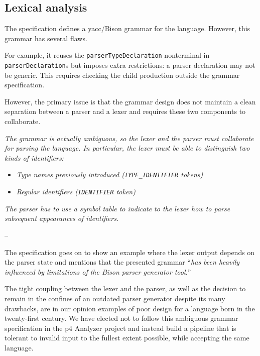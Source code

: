 \subsection{Lexical analysis}

The \pfs specification defines a \acrshort{yacc}/Bison grammar for the language.
However, this grammar has several flaws.

For example, it reuses the \texttt{parserTypeDeclaration} non\-terminal in
\texttt{parserDeclaration}s but imposes extra restrictions: a parser declaration
may not be generic. This requires checking the child production outside the
grammar specification.

However, the primary issue is that the grammar design does not maintain a clean
separation between a parser and a lexer and requires these two components to
collaborate.

\begin{displayquote}
	\textit{The grammar is actually ambiguous, so the lexer and the parser must
	collaborate for parsing the language. In particular, the lexer must be able
	to distinguish two kinds of identifiers:}

	\begin{itemize}
		\item \textit{Type names previously introduced (\texttt{TYPE\_IDENTIFIER}
		tokens)}
		\item \textit{Regular identifiers (\texttt{IDENTIFIER} token)}
	\end{itemize}

	\textit{The parser has to use a symbol table to indicate to the lexer how to
	parse subsequent appearances of identifiers.}

	--  \cite{p416:v123:spec}
\end{displayquote}

The specification goes on to show an example where the lexer output depends on
the parser state and mentions that the presented grammar ``\textit{has been heavily
influenced by limitations of the Bison parser generator tool.}''

The tight coupling between the lexer and the parser, as well as the decision to
remain in the confines of an outdated parser generator despite its many
drawbacks, are in our opinion examples of poor design for a language born in the
twenty-first century. We have elected not to follow this ambiguous grammar
specification in the \acrshort{p4} Analyzer project and instead build a pipeline
that is tolerant to invalid input to the fullest extent possible, while
accepting the same language.

